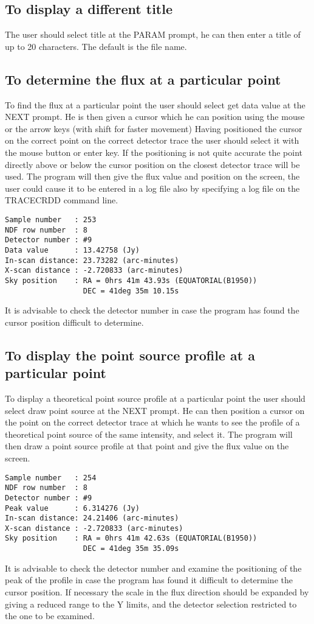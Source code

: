 \documentclass[twoside,11pt]{article}
\begin{document}
\subsection{To display a different title}
The user should select title at the PARAM prompt, he can then enter a title of
up to 20 characters. The default is the file name.
\subsection{To determine the flux at a particular point}
To find the flux at a particular point the user should select get data value at
the NEXT prompt. He is then given a cursor which he can position using the mouse
or the arrow keys (with shift for faster movement) Having positioned the cursor
on the correct point on the correct detector trace the user should select it
with the mouse button or enter key. If the positioning is not quite accurate
the point directly above or below the cursor position on the closest detector
trace will be used. The program will then give the flux value and position on
the screen, the user could cause it to be entered in a log file also by
specifying a log file on the TRACECRDD command line.
\begin{small}
\begin{verbatim}
Sample number   : 253  
NDF row number  : 8    
Detector number : #9  
Data value      : 13.42758 (Jy)
In-scan distance: 23.73282 (arc-minutes)
X-scan distance : -2.720833 (arc-minutes)
Sky position    : RA = 0hrs 41m 43.93s (EQUATORIAL(B1950))
                  DEC = 41deg 35m 10.15s
\end{verbatim}
\end{small}
It is advisable to check the detector number in case the program has found the
cursor position difficult to determine.
\subsection{To display the point source profile at a particular point}
To display a theoretical point source profile at a particular point the user
should select draw point source at the NEXT prompt. He can then position a
cursor on the point on the correct detector trace at which he wants to see the
profile of a theoretical point source of the same intensity, and select it. The
program will then draw a point source profile at that point and give the flux
value on the screen.
\begin{small}
\begin{verbatim}
Sample number   : 254  
NDF row number  : 8    
Detector number : #9  
Peak value      : 6.314276 (Jy)
In-scan distance: 24.21406 (arc-minutes)
X-scan distance : -2.720833 (arc-minutes)
Sky position    : RA = 0hrs 41m 42.63s (EQUATORIAL(B1950))
                  DEC = 41deg 35m 35.09s
\end{verbatim}
\end{small}
It is advisable to check the detector number and examine the positioning of the 
peak of the profile in case the program has found it difficult to determine 
the cursor position. If necessary the scale in the flux direction should be 
expanded by giving a reduced range to the Y limits, and the detector selection 
restricted to the one to be examined.
\end{document}
